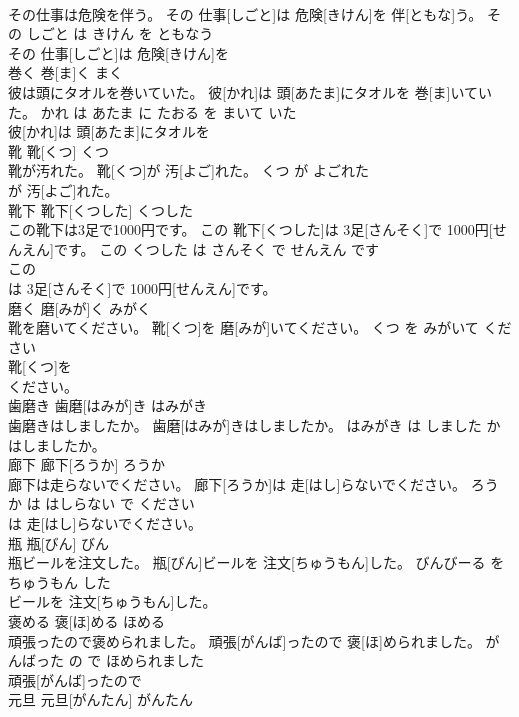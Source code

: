 \documentclass[8pt]{extreport}
\begin{document}
\begin{CJK}{UTF8}{min}
\\	その仕事は危険を伴う。	その 仕事[しごと]は 危険[きけん]を 伴[ともな]う。	その しごと は きけん を ともなう	
\\	その 仕事[しごと]は 危険[きけん]を
\\	巻く	巻[ま]く	まく	
\\	彼は頭にタオルを巻いていた。	彼[かれ]は 頭[あたま]にタオルを 巻[ま]いていた。	かれ は あたま に たおる を まいて いた	
\\	彼[かれ]は 頭[あたま]にタオルを
\\	靴	靴[くつ]	くつ	
\\	靴が汚れた。	靴[くつ]が 汚[よご]れた。	くつ が よごれた	
\\	が 汚[よご]れた。			
\\	靴下	靴下[くつした]	くつした	
\\	この靴下は3足で1000円です。	この 靴下[くつした]は 3足[さんそく]で 1000円[せんえん]です。	この くつした は さんそく で せんえん です	
\\	この
\\	は 3足[さんそく]で 1000円[せんえん]です。			
\\	磨く	磨[みが]く	みがく	
\\	靴を磨いてください。	靴[くつ]を 磨[みが]いてください。	くつ を みがいて ください	
\\	靴[くつ]を
\\	ください。			
\\	歯磨き	歯磨[はみが]き	はみがき	
\\	歯磨きはしましたか。	歯磨[はみが]きはしましたか。	はみがき は しました か	
\\	はしましたか。			
\\	廊下	廊下[ろうか]	ろうか	
\\	廊下は走らないでください。	廊下[ろうか]は 走[はし]らないでください。	ろうか は はしらない で ください	
\\	は 走[はし]らないでください。			
\\	瓶	瓶[びん]	びん	
\\	瓶ビールを注文した。	瓶[びん]ビールを 注文[ちゅうもん]した。	びんびーる を ちゅうもん した	
\\	ビールを 注文[ちゅうもん]した。			
\\	褒める	褒[ほ]める	ほめる	
\\	頑張ったので褒められました。	頑張[がんば]ったので 褒[ほ]められました。	がんばった の で ほめられました	
\\	頑張[がんば]ったので
\\	元旦	元旦[がんたん]	がんたん	

\end{CJK}
\end{document}
